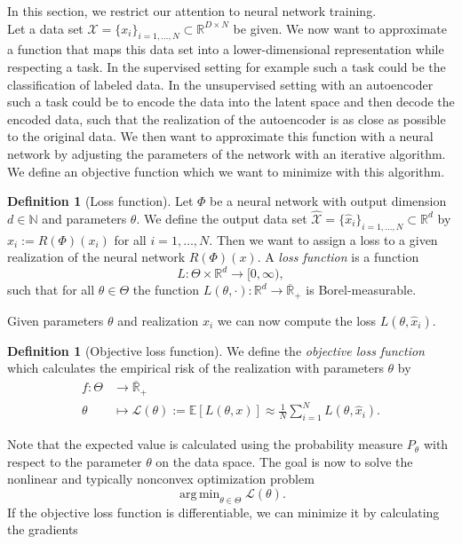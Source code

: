 \documentclass[11pt,titlepage]{article}
\newcommand{\R}{\mathbb{R}} %
\newcommand{\N}{\mathbb{N}} %
\newcommand{\E}{\mathbb{E}} %
\DeclareMathOperator*{\argmin}{arg\,min}
\theoremstyle{definition}
\newtheorem{definition}[theorem]{Definition}
\theoremstyle{remark}
\begin{document}
	In this section, we restrict our attention to neural network training. \\
	Let a data set $\mathcal{X} = \{x_i\}_{i=1,\ldots,N}\subset\R^{D\times N}$ be given. We now want to approximate a function that maps this data set into a lower-dimensional representation while respecting a task. In the supervised setting for example such a task could be the classification of labeled data. In 
	the unsupervised setting with an autoencoder such a task could be to encode the data into the latent space and then decode the encoded data, such that the realization of the autoencoder is as close as possible to the original data.
	We then want to approximate this function with a neural network by adjusting the parameters of the network with an iterative algorithm. We define an objective function which we want to minimize with this algorithm.
	\begin{definition}[Loss function]
		Let $\Phi$ be a neural network with output dimension $d\in\N$ and parameters $\theta$. We define the output data set $\hat{\mathcal{X}} = \{\hat{x}_i\}_{i=1,\ldots,N}\subset \R^d$ 
		by $\hat{x}_i := R(\Phi)(x_i)$ for all $i=1,\ldots,N$. Then we want to assign a loss to a given realization of the neural network $R(\Phi)(x)$. A \textsl{loss function} is a function
		\[L:\Theta\times\R^d\to[0,\infty),\]
		such that for all $\theta\in\Theta$ the function $L(\theta,\cdot):\R^d \to\overline{\R}_+$ 
		is Borel-measurable.
	\end{definition}
	Given parameters $\theta$ and realization $\hat{x}_i$ we can now 
	compute the loss $L(\theta, \hat{x}_i)$.
	\begin{definition}[Objective loss function]
		We define the \textsl{objective loss function} which calculates 
		the empirical risk of the realization with parameters $\theta$ by
		\begin{align*}
			f:\Theta&\to\overline{\R}_+ \\
			\theta&\mapsto \mathcal{L}(\theta) := \E[L(\theta, x)] \approx \frac{1}{N} \sum_{i=1}^N L(\theta, \hat{x}_i).
		\end{align*}
	\end{definition}
	Note that the expected value is calculated using the probability measure $P_\theta$ 
	with respect to the parameter $\theta$ on the data space. The goal is now to solve the nonlinear and 
	typically nonconvex optimization problem
	\[\argmin_{\theta\in\Theta} \mathcal{L}(\theta).\]
	If the objective loss function is differentiable, we can minimize it by calculating the gradients
\end{document}
